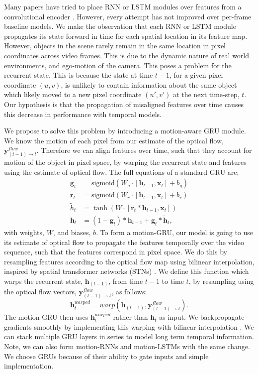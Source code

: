 Many papers have tried to place RNN or LSTM modules over features from a convolutional encoder \citep{patraucean2015spatio,valipour2017recurrent}. However, every attempt has not improved over per-frame baseline models. We make the observation that each RNN or LSTM module propagates its state forward in time for each spatial location in its feature map. However, objects in the scene rarely remain in the same location in pixel coordinates across video frames. This is due to the dynamic nature of real world environments, and ego-motion of the camera. This poses a problem for the recurrent state. This is because the state at time $t-1$, for a given pixel coordinate $(u,v)$, is unlikely to contain information about the same object which likely moved to a new pixel coordinate $(u',v')$ at the next time-step, $t$. Our hypothesis is that the propagation of misaligned features over time causes this decrease in performance with temporal models.

We propose to solve this problem by introducing a motion-aware GRU module. We know the motion of each pixel from our estimate of the optical flow, $\mathbf{y}^{flow}_{(t-1) \to t}$. Therefore we can align features over time, such that they account for motion of the object in pixel space, by warping the recurrent state and features using the estimate of optical flow. The full equations of a standard GRU are;
\begin{align}
\mathbf{g}_t &= \text{sigmoid}(W_g \cdot [\mathbf{h}_{t-1}, \mathbf{x}_t] + b_g) \\
\mathbf{r}_t &= \text{sigmoid}(W_r \cdot [\mathbf{h}_{t-1}, \mathbf{x}_t] + b_r) \\
\widetilde{h}_t &= \tanh (W \cdot [\mathbf{r}_t * \mathbf{h}_{t-1}, \mathbf{x}_t]) \\
\mathbf{h}_t &= (1-\mathbf{g}_t) * \mathbf{h}_{t-1} + \mathbf{g}_t * \mathbf{\widetilde{h}}_t,
\end{align}
with weights, $W$, and biases, $b$. To form a motion-GRU, our model is going to use its estimate of optical flow to propagate the features temporally over the video sequence, such that the features correspond in pixel space. We do this by resampling features according to the optical flow map using bilinear interpolation, inspired by spatial transformer networks (STNs) \citep{jaderberg2015spatial}.
We define this function which warps the recurrent state, $\mathbf{h}_{(t-1)}$, from time $t-1$ to time $t$, by resampling using the optical flow vectors, $\mathbf{y}^{flow}_{(t-1) \to t}$, as follows:
\begin{equation}
\mathbf{h}^{warped}_{t} = warp(\mathbf{h}_{(t-1)}, \mathbf{y}^{flow}_{(t-1) \to t}).
\end{equation}
The motion-GRU then uses $\mathbf{h}^{warped}_{t}$ rather than $\mathbf{h}_t$ as input. We backpropagate gradients smoothly by implementing this warping with bilinear interpolation \citep{jaderberg2015spatial}. We can stack multiple GRU layers in series to model long term temporal information. Note, we can also form motion-RNNs and motion-LSTMs with the same change. We choose GRUs because of their ability to gate inputs and simple implementation.

